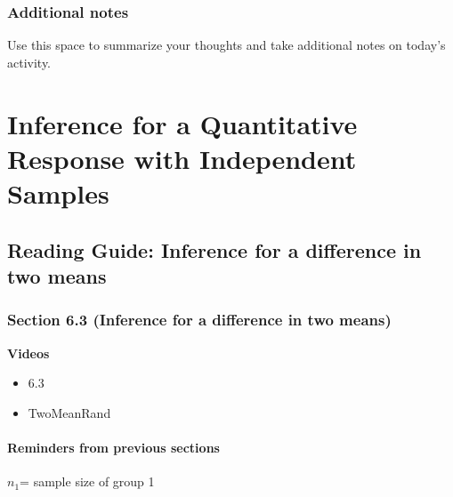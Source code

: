 \documentclass[
]{report}
\providecommand{\tightlist}{%
  \setlength{\itemsep}{0pt}\setlength{\parskip}{0pt}}
\begin{document}
\hypertarget{additional-notes-9}{%
\subsection{Additional notes}\label{additional-notes-9}}

Use this space to summarize your thoughts and take additional notes on today's activity.

\hypertarget{inference-for-a-quantitative-response-with-independent-samples}{%
\chapter{Inference for a Quantitative Response with Independent Samples}\label{inference-for-a-quantitative-response-with-independent-samples}}

\hypertarget{reading-guide-inference-for-a-difference-in-two-means}{%
\section{Reading Guide: Inference for a difference in two means}\label{reading-guide-inference-for-a-difference-in-two-means}}

\hypertarget{section-6.3-inference-for-a-difference-in-two-means}{%
\subsection*{Section 6.3 (Inference for a difference in two means)}\label{section-6.3-inference-for-a-difference-in-two-means}}

\textbf{Videos}

\begin{itemize}
\tightlist
\item
  6.3
\item
  TwoMeanRand
\end{itemize}


\hypertarget{reminders-from-previous-sections-8}{%
\subsubsection*{Reminders from previous sections}\label{reminders-from-previous-sections-8}}

\(n_1\)= sample size of group 1
\end{document}
